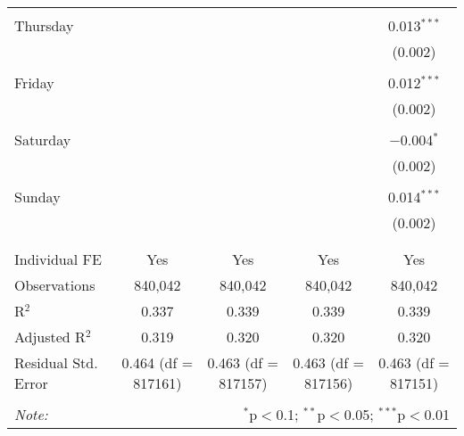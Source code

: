 \documentclass[
]{article}
\begin{document}
\begin{table}[!htbp]
{\begin{tabular}{@{\extracolsep{5pt}}lcccc}
  & & & & \\ 
 Thursday &  &  &  & 0.013$^{***}$ \\ 
  &  &  &  & (0.002) \\ 
  & & & & \\ 
 Friday &  &  &  & 0.012$^{***}$ \\ 
  &  &  &  & (0.002) \\ 
  & & & & \\ 
 Saturday &  &  &  & $-$0.004$^{*}$ \\ 
  &  &  &  & (0.002) \\ 
  & & & & \\ 
 Sunday &  &  &  & 0.014$^{***}$ \\ 
  &  &  &  & (0.002) \\ 
  & & & & \\ 
\hline \\[-1.8ex] 
Individual FE & Yes & Yes & Yes & Yes \\ 
Observations & 840,042 & 840,042 & 840,042 & 840,042 \\ 
R$^{2}$ & 0.337 & 0.339 & 0.339 & 0.339 \\ 
Adjusted R$^{2}$ & 0.319 & 0.320 & 0.320 & 0.320 \\ 
Residual Std. Error & 0.464 (df = 817161) & 0.463 (df = 817157) & 0.463 (df = 817156) & 0.463 (df = 817151) \\ 
\hline 
\hline \\[-1.8ex] 
\textit{Note:}  & \multicolumn{4}{r}{$^{*}$p$<$0.1; $^{**}$p$<$0.05; $^{***}$p$<$0.01} \\ 
\end{tabular}
} 
\end{table} 
\newpage
\end{document}
